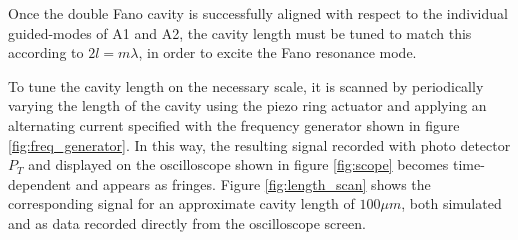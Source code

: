 Once the double Fano cavity is successfully aligned with respect to the individual guided-modes of A1 and A2, the cavity length must be tuned to match this according to $2 l = m \lambda$, in order to excite the Fano resonance mode.

To tune the cavity length on the necessary scale, it is scanned by periodically varying the length of the cavity using the piezo ring actuator and applying an alternating current specified with the frequency generator shown in figure \ref{fig:freq_generator}. In this way, the resulting signal recorded with photo detector $P_T$ and displayed on the oscilloscope shown in figure \ref{fig:scope} becomes time-dependent and appears as fringes. Figure \ref{fig:length_scan} shows the corresponding signal for an approximate cavity length of $100 \mu m$, both simulated and as data recorded directly from the oscilloscope screen.

